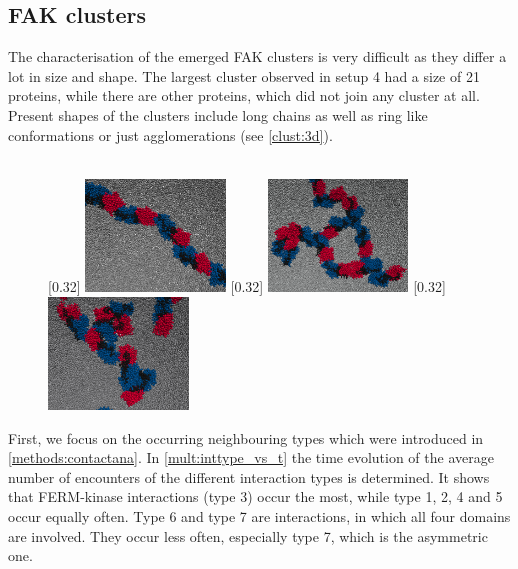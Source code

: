 \subsection{FAK clusters}
\label{mult:oligs}
The characterisation of the emerged FAK clusters is very difficult as they differ a lot in size and shape. The largest cluster observed in setup 4 had a size of 21 proteins, while there are other proteins, which did not join any cluster at all. Present shapes of the clusters include long chains as well as ring like conformations or just agglomerations (see \autoref{clust:3d}). \\
\\
%
%
%
\begin{figure}
	\subcaptionbox{\label{clust:3d_chain}}[0.32\textwidth]{
		\includegraphics[height=3cm]{figures/results/fak_chainlike}
	}\hfill%
	\subcaptionbox{\label{clust:3d_ring}}[0.32\textwidth]{
		\includegraphics[height=3cm]{figures/results/fak_circle}
	}\hfill%
	\subcaptionbox{\label{clust:3d_aggl}}[0.32\textwidth]{
		\includegraphics[height=3cm]{figures/results/fak_agglo}
	}
	\label{clust:3d}
\end{figure}
%
%
%
First, we focus on the occurring neighbouring types which were introduced in \autoref{methods:contactana}. In \autoref{mult:inttype_vs_t} the time evolution of the average number of encounters of the different interaction types is determined. It shows that FERM-kinase interactions (type 3) occur the most, while type 1, 2, 4 and 5 occur equally often. Type 6 and type 7 are interactions, in which all four domains are involved. They occur less often, especially type 7, which is the asymmetric one.\\
